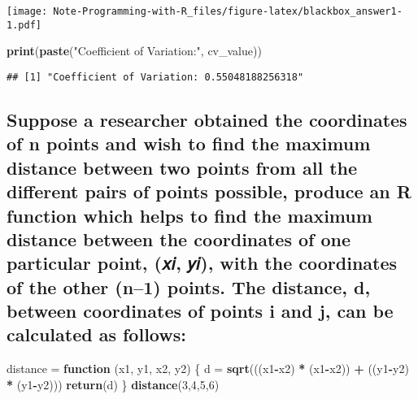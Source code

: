 \documentclass[
]{article}
\newenvironment{Shaded}{\begin{snugshade}}{\end{snugshade}}
\newcommand{\ControlFlowTok}[1]{\textcolor[rgb]{0.13,0.29,0.53}{\textbf{#1}}}
\newcommand{\DecValTok}[1]{\textcolor[rgb]{0.00,0.00,0.81}{#1}}
\newcommand{\FunctionTok}[1]{\textcolor[rgb]{0.13,0.29,0.53}{\textbf{#1}}}
\newcommand{\NormalTok}[1]{#1}
\newcommand{\OtherTok}[1]{\textcolor[rgb]{0.56,0.35,0.01}{#1}}
\newcommand{\SpecialCharTok}[1]{\textcolor[rgb]{0.81,0.36,0.00}{\textbf{#1}}}
\newcommand{\StringTok}[1]{\textcolor[rgb]{0.31,0.60,0.02}{#1}}
\begin{document}
\texttt{[image: Note-Programming-with-R\_files/figure-latex/blackbox\_answer1-1.pdf]}

\begin{Shaded}
\begin{Highlighting}[]
\FunctionTok{print}\NormalTok{(}\FunctionTok{paste}\NormalTok{(}\StringTok{"Coefficient of Variation:"}\NormalTok{, cv\_value))}
\end{Highlighting}
\end{Shaded}

\begin{verbatim}
## [1] "Coefficient of Variation: 0.55048188256318"
\end{verbatim}

\subsection{Suppose a researcher obtained the coordinates of n points
and wish to find the maximum distance between two points from all the
different pairs of points possible, produce an R function which helps to
find the maximum distance between the coordinates of one particular
point, (𝑥𝑖, 𝑦𝑖), with the coordinates of the other (n--1) points. The
distance, d, between coordinates of points i and j, can be calculated as
follows:}\label{suppose-a-researcher-obtained-the-coordinates-of-n-points-and-wish-to-find-the-maximum-distance-between-two-points-from-all-the-different-pairs-of-points-possible-produce-an-r-function-which-helps-to-find-the-maximum-distance-between-the-coordinates-of-one-particular-point-ux1d465ux1d456-ux1d466ux1d456-with-the-coordinates-of-the-other-n1-points.-the-distance-d-between-coordinates-of-points-i-and-j-can-be-calculated-as-follows}

\begin{Shaded}
\begin{Highlighting}[]
\NormalTok{distance }\OtherTok{=} \ControlFlowTok{function}\NormalTok{ (x1, y1, x2, y2) \{}
\NormalTok{  d }\OtherTok{=} \FunctionTok{sqrt}\NormalTok{(((x1}\SpecialCharTok{{-}}\NormalTok{x2) }\SpecialCharTok{*}\NormalTok{ (x1}\SpecialCharTok{{-}}\NormalTok{x2)) }\SpecialCharTok{+}\NormalTok{ ((y1}\SpecialCharTok{{-}}\NormalTok{y2) }\SpecialCharTok{*}\NormalTok{ (y1}\SpecialCharTok{{-}}\NormalTok{y2)))}
  \FunctionTok{return}\NormalTok{(d)}
\NormalTok{\}}
\FunctionTok{distance}\NormalTok{(}\DecValTok{3}\NormalTok{,}\DecValTok{4}\NormalTok{,}\DecValTok{5}\NormalTok{,}\DecValTok{6}\NormalTok{)}
\end{Highlighting}
\end{Shaded}
\end{document}
